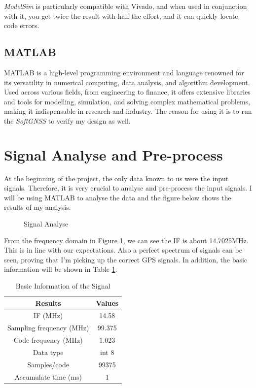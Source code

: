 \textit{ModelSim} is particularly compatible with Vivado, and when used in conjunction with it, you get twice the result with half the effort, and it can quickly locate code errors.

\subsection{MATLAB}
MATLAB is a high-level programming environment and language renowned for its versatility in numerical computing, data analysis, and algorithm development. Used across various fields, from engineering to finance, it offers extensive libraries and tools for modelling, simulation, and solving complex mathematical problems, making it indispensable in research and industry. The reason for using it is to run the \textit{SoftGNSS} to verify my design as well.

\section{Signal Analyse and Pre-process}
At the beginning of the project, the only data known to us were the input signals. Therefore, it is very crucial to analyse and pre-process the input signals. I will be using MATLAB to analyse the data and the figure below shows the results of my analysis.

\begin{figure}[!htbp]
    \centering
    
    \caption{Signal Analyse}
    \label{fig:sig_info}
\end{figure}

From the frequency domain in Figure \ref{fig:sig_info}, we can see the IF is about 14.7025MHz. This is in line with our expectations. Also a perfect spectrum of signals can be seen, proving that I'm picking up the correct GPS signals. In addition, the basic information will be shown in Table \ref{tab:sig_info}.

\begin{table}[H]
\centering
\renewcommand\arraystretch{1.5}
\caption{Basic Information of the Signal}
\label{tab:sig_info}
\begin{tabular}{cc}
    \toprule
    Results & Values \\
    \midrule
    IF (MHz) & 14.58 \\
    Sampling frequency (MHz) & 99.375 \\
    Code frequency (MHz) & 1.023 \\
    Data type & int 8 \\
    Samples/code & \num{99375} \\
    Accumulate time (ms) & 1 \\
    \bottomrule
\end{tabular}
\end{table}

